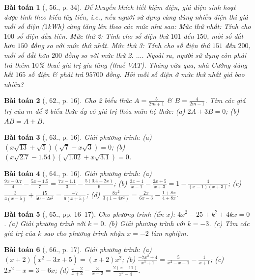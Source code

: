 \documentclass{article}
\newtheorem{baitoan}{Bài toán}
\begin{document}
\begin{baitoan}[\cite{SGK_Toan_8_tap_2}, 56., p. 34]
	Để khuyến khích tiết kiệm điện, giá điện sinh hoạt được tính theo kiểu lũy tiến, i.e., nếu người sử dụng càng dùng nhiều điện thì giá mỗi số điện ($1$kWh) càng tăng lên theo các mức như sau: Mức thứ nhất: Tính cho $100$ số điện đầu tiên. Mức thứ 2: Tính cho số điện thứ $101$ đến $150$, mỗi số đắt hơn $150$ đồng so với mức thứ nhất. Mức thứ 3: Tính cho số điện thứ $151$ đến $200$, mỗi số đắt hơn $200$ đồng so với mức thứ 2. $\ldots$. Ngoài ra, người sử dụng còn phải trả thêm $10$\% thuế giá trị gia tăng (thuế VAT). Tháng vừa qua, nhà Cường dùng hết $165$ số điện \& phải trả $95700$ đồng. Hỏi mỗi số điện ở mức thứ nhất giá bao nhiêu?
\end{baitoan}

\begin{baitoan}[\cite{SBT_Toan_8_tap_2}, 62., p. 16]
	Cho 2 biểu thức $A = \frac{5}{2m + 1}$ \& $B = \frac{4}{2m - 1}$. Tìm các giá trị của $m$ để 2 biểu thức ấy có giá trị thỏa mãn hệ thức: (a) $2A + 3B = 0$; (b) $AB = A + B$.
\end{baitoan}

\begin{baitoan}[\cite{SBT_Toan_8_tap_2}, 63., p. 16]
	Giải phương trình: (a) $(x\sqrt{13} + \sqrt{5})(\sqrt{7} - x\sqrt{3}) = 0$; (b) $(x\sqrt{2.7} - 1.54)(\sqrt{1.02} + x\sqrt{3.1}) = 0$.
\end{baitoan}

\begin{baitoan}[\cite{SBT_Toan_8_tap_2}, 64., p. 16]
	Giải phương trình: (a) $\frac{9x - 0.7}{4} - \frac{5x - 1.5}{7} = \frac{7x - 1.1}{3} - \frac{5(0.4 - 2x)}{6}$; (b) $\frac{3x - 1}{x - 1} - \frac{2x + 5}{x + 3} = 1 - \frac{4}{(x - 1)(x + 3)}$; (c) $\frac{3}{4(x - 5)} + \frac{15}{50 - 2x^2} = \frac{-7}{6(x + 5)}$; (d) $\frac{8x^2}{3(1 - 4x^2)} = \frac{2x}{6x - 3} - \frac{1 + 8x}{4 + 8x}$.
\end{baitoan}

\begin{baitoan}[\cite{SBT_Toan_8_tap_2}, 65., pp. 16--17]
	Cho phương trình (ẩn $x$): $4x^2 - 25 + k^2 + 4kx = 0$. (a) Giải phương trình với $k = 0$. (b) Giải phương trình với $k = -3$. (c) Tìm các giá trị của $k$ sao cho phương trình nhận $x = -2$ làm nghiệm.
\end{baitoan}

\begin{baitoan}[\cite{SBT_Toan_8_tap_2}, 66., p. 17]
	Giải phương trình: (a) $(x + 2)(x^2 - 3x + 5) = (x + 2)x^2$; (b) $\frac{-7x^2 + 4}{x^3 + 1} = \frac{5}{x^2 - x + 1} - \frac{1}{x + 1}$; (c) $2x^2 - x = 3 - 6x$; (d) $\frac{x - 2}{x + 2} - \frac{3}{x - 2} = \frac{2(x - 11)}{x^2 - 4}$.
\end{baitoan}
\end{document}
